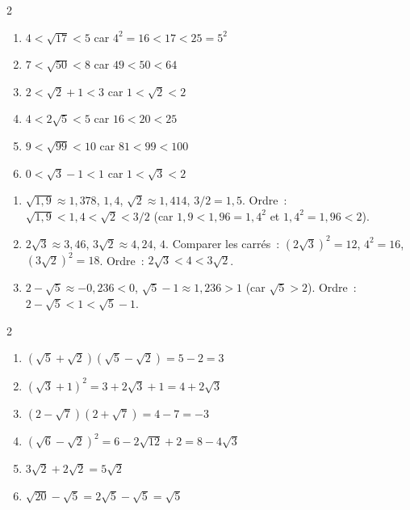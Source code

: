 
\begin{multicols}{2}
\begin{enumerate}
  \item $4<\sqrt{17}<5$ car $4^2=16<17<25=5^2$
  \item $7<\sqrt{50}<8$ car $49<50<64$
  \item $2<\sqrt{2}+1<3$ car $1<\sqrt{2}<2$
  \item $4<2\sqrt{5}<5$ car $16<20<25$
  \item $9<\sqrt{99}<10$ car $81<99<100$
  \item $0<\sqrt{3}-1<1$ car $1<\sqrt{3}<2$
\end{enumerate}
\end{multicols}

\begin{enumerate}
  \item $\sqrt{1{,}9}\approx1{,}378$, $1{,}4$, $\sqrt{2}\approx1{,}414$, $3/2=1{,}5$.
        Ordre~: $\sqrt{1{,}9} < 1{,}4 < \sqrt{2} < 3/2$
        (car $1{,}9<1{,}96=1{,}4^2$ et $1{,}4^2=1{,}96<2$).
  \item $2\sqrt{3}\approx3{,}46$, $3\sqrt{2}\approx4{,}24$, $4$.
        Comparer les carr\'es~: $(2\sqrt{3})^2=12$, $4^2=16$, $(3\sqrt{2})^2=18$.
        Ordre~: $2\sqrt{3}<4<3\sqrt{2}$.
  \item $2-\sqrt{5}\approx-0{,}236<0$, $\sqrt{5}-1\approx1{,}236>1$ (car $\sqrt5>2$).
        Ordre~: $2-\sqrt{5}<1<\sqrt{5}-1$.
\end{enumerate}
\begin{multicols}{2}
\begin{enumerate}
  \item $(\sqrt{5}+\sqrt{2})(\sqrt{5}-\sqrt{2})=5-2=3$
  \item $(\sqrt{3}+1)^2=3+2\sqrt{3}+1=4+2\sqrt{3}$
  \item $(2-\sqrt{7})(2+\sqrt{7})=4-7=-3$
  \item $(\sqrt{6}-\sqrt{2})^2=6-2\sqrt{12}+2=8-4\sqrt{3}$
  \item $3\sqrt{2}+2\sqrt{2}=5\sqrt{2}$
  \item $\sqrt{20}-\sqrt{5}=2\sqrt{5}-\sqrt{5}=\sqrt{5}$
\end{enumerate}
\end{multicols}

